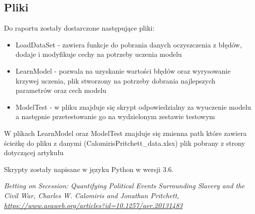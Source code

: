 \documentclass[a4paper,12pt]{article}
\begin{document}
	\subsection{Pliki}
		Do raportu zostały dostarczone następujące pliki:
		\begin{itemize}
			\item LoadDataSet - zawiera funkcje do pobrania danych oczyszczenia z błędów, dodaje i modyfikuje cechy na potrzeby uczenia modelu
			\item LearnModel - pozwala na uzyskanie wartości błędów oraz wyrysowanie krzywej uczenia, plik stworzony na potrzeby dobrania najlepszych parametrów oraz cech modelu
			\item ModelTest - w pliku znajduje się skrypt odpowiedzialny za wyuczenie modelu a następnie przetestowanie go na wydzielonym zestawie testowym
		\end{itemize}
	W plikach LearnModel oraz ModelTest znajduje się zmienna path które zawiera ścieżkę do pliku z danymi (CalomirisPritchett\_data.xlsx) plik pobrany z strony dotyczącej artykułu\cite{slave_article}
	
	Skrypty zostały napisane w języku Python w wersji 3.6.
		
	
\begin{thebibliography}{99}
	\textit {Betting on Secession: Quantifying Political Events Surrounding Slavery and the Civil War, Charles W. Calomiris and Jonathan Pritchett, \url{https://www.aeaweb.org/articles?id=10.1257/aer.20131483}}

\end{thebibliography}	
		
\end{document}
